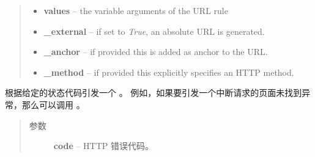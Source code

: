 \documentclass[a4paper,12pt]{sphinxmanual}
\begin{document}
\begin{fulllineitems}
\begin{quote}
\begin{description}
\begin{itemize}
\item {} 
\textbf{values} -- the variable arguments of the URL rule

\item {} 
\textbf{\_external} -- if set to \emph{True}, an absolute URL is generated.

\item {} 
\textbf{\_anchor} -- if provided this is added as anchor to the URL.

\item {} 
\textbf{\_method} -- if provided this explicitly specifies an HTTP method.

\end{itemize}

\end{description}\end{quote}

\end{fulllineitems}


\begin{fulllineitems}
\label{api:flask.abort}
根据给定的状态代码引发一个 \href{http://werkzeug.pocoo.org/docs/exceptions/\#werkzeug.exceptions.HTTPException}{} 。
例如，如果要引发一个中断请求的页面未找到异常，那么可以调用  。
\begin{quote}\begin{description}
\item[{参数}] \leavevmode
\textbf{code} -- HTTP 错误代码。

\end{description}\end{quote}

\end{fulllineitems}

\end{document}
